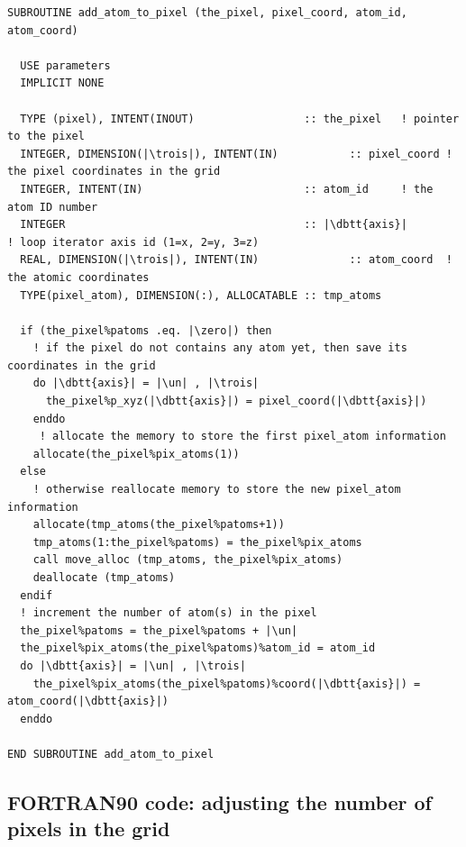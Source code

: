 \begin{lstlisting}[language={[90]FORTRAN}]
SUBROUTINE add_atom_to_pixel (the_pixel, pixel_coord, atom_id, atom_coord)

  USE parameters
  IMPLICIT NONE

  TYPE (pixel), INTENT(INOUT)                 :: the_pixel   ! pointer to the pixel
  INTEGER, DIMENSION(|\trois|), INTENT(IN)           :: pixel_coord ! the pixel coordinates in the grid
  INTEGER, INTENT(IN)                         :: atom_id     ! the atom ID number
  INTEGER                                     :: |\dbtt{axis}|        ! loop iterator axis id (1=x, 2=y, 3=z)
  REAL, DIMENSION(|\trois|), INTENT(IN)              :: atom_coord  ! the atomic coordinates
  TYPE(pixel_atom), DIMENSION(:), ALLOCATABLE :: tmp_atoms

  if (the_pixel%patoms .eq. |\zero|) then
    ! if the pixel do not contains any atom yet, then save its coordinates in the grid
    do |\dbtt{axis}| = |\un| , |\trois|
      the_pixel%p_xyz(|\dbtt{axis}|) = pixel_coord(|\dbtt{axis}|)
    enddo
     ! allocate the memory to store the first pixel_atom information
    allocate(the_pixel%pix_atoms(1))
  else
    ! otherwise reallocate memory to store the new pixel_atom information
    allocate(tmp_atoms(the_pixel%patoms+1))
    tmp_atoms(1:the_pixel%patoms) = the_pixel%pix_atoms
    call move_alloc (tmp_atoms, the_pixel%pix_atoms)
    deallocate (tmp_atoms)
  endif
  ! increment the number of atom(s) in the pixel
  the_pixel%patoms = the_pixel%patoms + |\un|
  the_pixel%pix_atoms(the_pixel%patoms)%atom_id = atom_id
  do |\dbtt{axis}| = |\un| , |\trois|
    the_pixel%pix_atoms(the_pixel%patoms)%coord(|\dbtt{axis}|) = atom_coord(|\dbtt{axis}|)
  enddo

END SUBROUTINE add_atom_to_pixel
\end{lstlisting}

\clearpage

\subsection{FORTRAN90 code: adjusting the number of pixels in the grid}
\label{f-adjust-pixel-grid}

